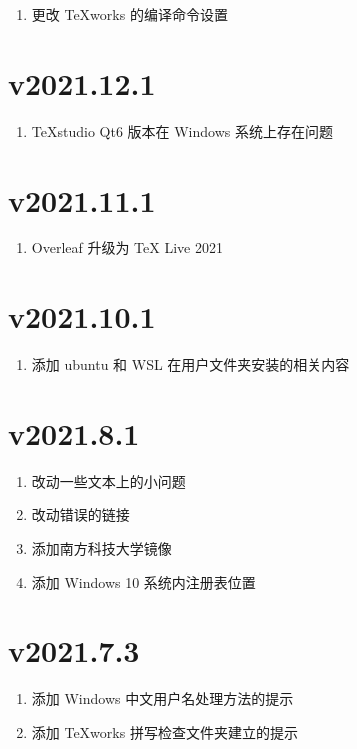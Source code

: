 \begin{enumerate}
  \item 更改 \TeX works 的编译命令设置
\end{enumerate}

\section*{v2021.12.1}

\begin{enumerate}
  \item \TeX studio Qt6 版本在 Windows 系统上存在问题
\end{enumerate}

\section*{v2021.11.1}

\begin{enumerate}
  \item Overleaf 升级为 \TeX{} Live 2021
\end{enumerate}

\section*{v2021.10.1}

\begin{enumerate}
  \item 添加 ubuntu 和 WSL 在用户文件夹安装的相关内容
\end{enumerate}

\section*{v2021.8.1}

\begin{enumerate}
  \item 改动一些文本上的小问题
  \item 改动错误的链接
  \item 添加南方科技大学镜像
  \item 添加 Windows 10 系统内注册表位置
\end{enumerate}

\section*{v2021.7.3}

\begin{enumerate}
  \item 添加 Windows 中文用户名处理方法的提示
  \item 添加 \TeX works 拼写检查文件夹建立的提示
\end{enumerate}

